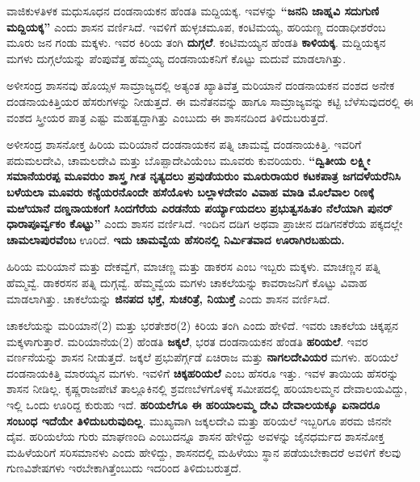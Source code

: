 ವಾಜಿಕುಳತಿಳಕ ಮಧುಸೂಧನ ದಂಡನಾಯಕನ ಹೆಂಡತಿ ಮದ್ದಿಯಕ್ಕ. ಇವಳನ್ನು \textbf{“ಜನನಿ ಜಾಹ್ನವಿ ಸದುಗುಣಿ ಮದ್ದಿಯಕ್ಕ”} ಎಂದು ಶಾಸನ ವರ್ಣಿಸಿದೆ. ಇವಳಿಗೆ ಹುಳ್ಳಚಮೂಪ, ಕಂಟಿಮಯ್ಯ, ಹರಿಯಣ್ಣ ದಂಡಾಧೀಶರೆಂಬ ಮೂರು ಜನ ಗಂಡು ಮಕ್ಕಳು. ಇವರ ಕಿರಿಯ ತಂಗಿ \textbf{ದುಗ್ಗಲೆ}. ಕಂಟಿಮಯ್ಯನ ಹೆಂಡತಿ \textbf{ಕಾಳಿಯಕ್ಕ}. ಮದ್ದಿಯಕ್ಕನ ಮಗಳು ದುಗ್ಗಲೆಯನ್ನು ಪೆಂಪುವೆತ್ತ ಹೆಮ್ಮಯ್ಯ ದಂಡನಾಯಕನಿಗೆ ಕೊಟ್ಟು ಮದುವೆ ಮಾಡಲಾಗಿತ್ತು.

ಅಳೀಸಂದ್ರ ಶಾಸನವು ಹೊಯ್ಸಳ ಸಾಮ್ರಾಜ್ಯದಲ್ಲಿ ಅತ್ಯಂತ ಖ್ಯಾತಿವೆತ್ತ ಮರಿಯಾನೆ ದಂಡನಾಯಕನ ವಂಶದ ಅನೇಕ ದಂಡನಾಯಕಿತ್ತಿಯರ ಹೆಸರುಗಳನ್ನು ನೀಡುತ್ತದೆ. ಈ ಮನೆತನವನ್ನು ಹಾಗೂ ಸಾಮ್ರಾಜ್ಯವನ್ನು ಕಟ್ಟಿ ಬೆಳೆಸುವುದರಲ್ಲಿ ಈ ವಂಶದ ಸ್ತ್ರೀಯರ ಪಾತ್ರ ಎಷ್ಟು ಮಹತ್ವದ್ದಾಗಿತ್ತು ಎಂಬುದು ಈ ಶಾಸನದಿಂದ ತಿಳಿದುಬರುತ್ತದೆ.

ಅಳೀಸಂದ್ರ ಶಾಸನೋಕ್ತ ಹಿರಿಯ ಮರಿಯಾನೆ ದಂಡನಾಯಕನ ಪತ್ನಿ ಚಾಮವ್ವೆ ದಂಡನಾಯಕಿತ್ತಿ. ಇವರಿಗೆ ಪದುಮಲದೇವಿ, ಚಾಮಲದೇವಿ ಮತ್ತು ಬೊಪ್ಪಾದೇವಿಯೆಂಬ ಮೂವರು ಕುವರಿಯರು. \textbf{“ದ್ವಿತೀಯ ಲಕ್ಷ್ಮೀ ಸಮಾನೆಯರಪ್ಪ ಮೂವರುಂ ಶಾಸ್ತ್ರ ಗೀತ ನೃತ್ಯದಲು ಪ್ರವುಡೆಯರುಂ ಮೂರುರಾಯರ ಕಟಕಪಾತ್ರ ಜಗದಳೆಯರೆನಿಸಿ ಬಳೆಯಲಾ ಮೂವರು ಕನ್ಯೆಯರನೊಂದೇ ಹಸೆಯೊಳು ಬಲ್ಲಾಳದೇವಂ ವಿವಾಹ ಮಾಡಿ ಮೊಲೆವಾಲ ರಿಣಕ್ಕೆ ಮಱಿಯಾನೆ ದಣ್ಡನಾಯಕಂಗೆ ಸಿಂದಗೆರೆಯ ಎರಡನೆಯ ಪರ್ಯ್ಯಾಯದಲು ಪ್ರಭುತ್ವಸಹಿತಂ ನೆಲೆಯಾಗಿ ಪುನರ್​ಧಾರಾಪೂರ್ವ್ವಕಂ ಕೊಟ್ಟು”} ಎಂದು ಶಾಸನ ವರ್ಣಿಸಿದೆ. ಇಂದಿನ ದಡಿಗ ಅಥವಾ ಪ್ರಾಚೀನ ದಡಿಗನಕೆರೆಯ ಪಕ್ಕದಲ್ಲೇ \textbf{ಚಾಮಲಾಪುರವೆಂಬ} ಊರಿದೆ. \textbf{ಇದು ಚಾಮವ್ವೆಯ ಹೆಸರಿನಲ್ಲಿ ನಿರ್ಮಿತವಾದ ಊರಾಗಿರಬಹುದು.}

\newpage

ಹಿರಿಯ ಮರಿಯಾನೆ ಮತ್ತು ದೇಕವ್ವೆಗೆ, ಮಾಚಣ್ಣ ಮತ್ತು ಡಾಕರಸ ಎಂಬ ಇಬ್ಬರು ಮಕ್ಕಳು. ಮಾಚಣ್ಣನ ಪತ್ನಿ ಹೆಮ್ಮವ್ವೆ. ಡಾಕರಸನ ಪತ್ನಿ ದುಗ್ಗವ್ವೆ. ಹೆಮ್ಮವ್ವೆಯ ಮಗಳು ಚಾಕಲೆಯನ್ನು ಕಾವರಾಜನಿಗೆ ಕೊಟ್ಟು ವಿವಾಹ ಮಾಡಲಾಗಿತ್ತು. ಚಾಕಲೆಯನ್ನು \textbf{ಜಿನಪದ ಭಕ್ತೆ, ಸುಚರಿತ್ರೆ, ನಿಯುಕ್ತೆ} ಎಂದು ಶಾಸನ ವರ್ಣಿಸಿದೆ.

\vskip -1pt

ಚಾಕಲೆಯನ್ನು ಮರಿಯಾನೆ(2) ಮತ್ತು ಭರತೇಶರ(2) ಕಿರಿಯ ತಂಗಿ ಎಂದು ಹೇಳಿದೆ. ಇವರು ಚಾಕಲೆಯ ಚಿಕ್ಕಪ್ಪನ ಮಕ್ಕಳಾಗುತ್ತಾರೆ. ಮರಿಯಾನೆಯ(2) ಹೆಂಡತಿ \textbf{ಜಕ್ಕಲೆ}, ಭರತ ದಂಡನಾಯಕನ ಹೆಂಡತಿ \textbf{ಹರಿಯಲೆ}. ಇವರ ವರ್ಣನೆಯನ್ನು ಶಾಸನ ನೀಡುತ್ತದೆ. ಜಕ್ಕಲೆ ಪ್ರಭುಪೆರ್ಗ್ಗಡೆ ಏಚಿರಾಜ ಮತ್ತು \textbf{ನಾಗಲದೇವಿಯರ} ಮಗಳು. ಹರಿಯಲೆ ದಂಡನಾಯಕಿತ್ತಿ ಮಾರಯ್ಯನ ಮಗಳು. ಇವಳಿಗೆ \textbf{ಚಿಕ್ಕಹರಿಯಲೆ} ಎಂಬ ಹೆಸರೂ ಇತ್ತು. ಇವಳ ತಾಯಿಯ ಹೆಸರನ್ನು ಶಾಸನ ನೀಡಿಲ್ಲ. ಕೃಷ್ಣರಾಜಪೇಟೆ ತಾಲ್ಲೂಕಿನಲ್ಲಿ ಶ್ರವಣಬೆಳಗೊಳಕ್ಕೆ ಸಮೀಪದಲ್ಲಿ ಹರಿಯಾಲಮ್ಮನ ದೇವಾಲಯವಿದ್ದು, ಇಲ್ಲಿ ಒಂದು ಊರಿದ್ದ ಕುರುಹು ಇದೆ. \textbf{ಹರಿಯಲೆಗೂ ಈ ಹರಿಯಾಲಮ್ಮ ದೇವಿ ದೇವಾಲಯಕ್ಕೂ ಏನಾದರೂ ಸಂಬಂಧ ಇದೆಯೇ ತಿಳಿದುಬರುವುದಿಲ್ಲ}. ಮುಖ್ಯವಾಗಿ ಜಕ್ಕಲದೇವಿ ಮತ್ತು ಹರಿಯಲೆ ಇಬ್ಬರಿಗೂ ಪರಮ ಜಿನನೇ ದೈವ. ಹರಿಯಲೆಯ ಗುರು ಮಾಘಣಂದಿ ಎಂಬುದನ್ನೂ ಶಾಸನ ಹೇಳಿದ್ದು ಅವಳನ್ನು ಜೈನಧರ್ಮದ ಶಾಸನೋಕ್ತ ಮಹಿಳೆಯರಿಗೆ ಸರಿಸಮಾನಳು ಎಂದು ಹೇಳಿದ್ದು, ಶಾಸನದಲ್ಲಿ ಮಹಿಳೆಯು ಸ್ಥಾನ ಪಡೆಯಬೇಕಾದರೆ ಅವಳಿಗೆ ಕೆಲವು ಗುಣವಿಶೇಷಗಳು ಇರಬೇಕಾಗಿತ್ತೆಂಬುದು ಇದರಿಂದ ತಿಳಿದುಬರುತ್ತದೆ.


